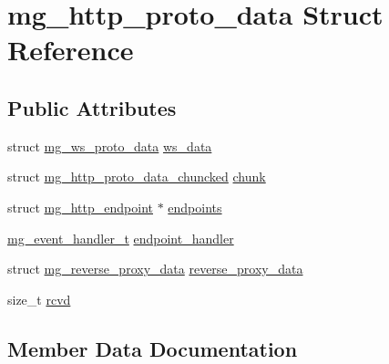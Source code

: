 \hypertarget{structmg__http__proto__data}{}\section{mg\+\_\+http\+\_\+proto\+\_\+data Struct Reference}
\label{structmg__http__proto__data}
\subsection*{Public Attributes}
\begin{DoxyCompactItemize}
\item 
struct \hyperlink{structmg__ws__proto__data}{mg\+\_\+ws\+\_\+proto\+\_\+data} \hyperlink{structmg__http__proto__data_a25d8b118af48eb310e9e86e91ede75eb_a25d8b118af48eb310e9e86e91ede75eb}{ws\+\_\+data}
\item 
struct \hyperlink{structmg__http__proto__data__chuncked}{mg\+\_\+http\+\_\+proto\+\_\+data\+\_\+chuncked} \hyperlink{structmg__http__proto__data_a36b052a8e6827001e15dd3e6aa38cbc9_a36b052a8e6827001e15dd3e6aa38cbc9}{chunk}
\item 
struct \hyperlink{structmg__http__endpoint}{mg\+\_\+http\+\_\+endpoint} $\ast$ \hyperlink{structmg__http__proto__data_a4c2bc1b9870ba96c459f4b5db1d3d5ed_a4c2bc1b9870ba96c459f4b5db1d3d5ed}{endpoints}
\item 
\hyperlink{mongoose_8h_ae5a76da37b3496fcdf561e51648eabda_ae5a76da37b3496fcdf561e51648eabda}{mg\+\_\+event\+\_\+handler\+\_\+t} \hyperlink{structmg__http__proto__data_ad117a16e518b9752e3f2b9ab6dacc0e3_ad117a16e518b9752e3f2b9ab6dacc0e3}{endpoint\+\_\+handler}
\item 
struct \hyperlink{structmg__reverse__proxy__data}{mg\+\_\+reverse\+\_\+proxy\+\_\+data} \hyperlink{structmg__http__proto__data_a5aab556501a2b7d27a44a87d51c86f8b_a5aab556501a2b7d27a44a87d51c86f8b}{reverse\+\_\+proxy\+\_\+data}
\item 
size\+\_\+t \hyperlink{structmg__http__proto__data_a2c8c53d0cf1a36075bad3a4c4a3bb915_a2c8c53d0cf1a36075bad3a4c4a3bb915}{rcvd}
\end{DoxyCompactItemize}


\subsection{Member Data Documentation}
\mbox{\label{structmg__http__proto__data_a36b052a8e6827001e15dd3e6aa38cbc9_a36b052a8e6827001e15dd3e6aa38cbc9}} 
